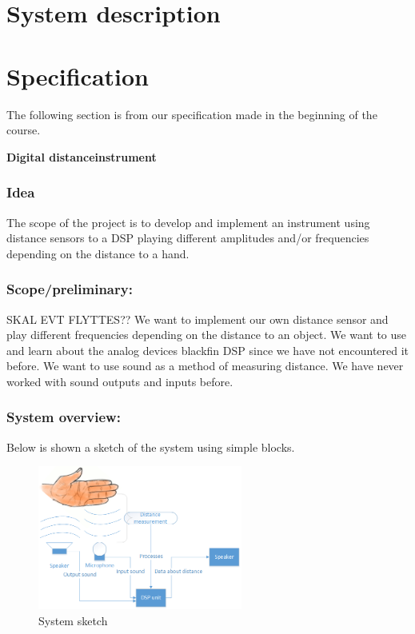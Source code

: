 \chapter{System description}
\chapter{Specification}
The following section is from our specification made in the beginning of the course.\\
\begin{center}
\textbf{\HUGE Digital distanceinstrument}\\
\end{center}
\subsection{Idea}
The scope of the project is to develop and implement an instrument using distance sensors to a DSP playing different amplitudes and/or frequencies depending on the distance to a hand.\\
\subsection{Scope/preliminary:}
SKAL EVT FLYTTES??
We want to implement our own distance sensor and play different frequencies depending on the distance to an object. We want to use and learn about the analog devices blackfin DSP since we have not encountered it before. We want to use sound as a method of measuring distance. We have never worked with sound outputs and inputs before.\\
\subsection{System overview:}
Below is shown a sketch of the system using simple blocks.
\begin{figure}[H]
\centering
\includegraphics[width=0.6\textwidth]{billeder/systemoverview}
\caption{System sketch}
\label{fig:systemoverview}
\end{figure}

